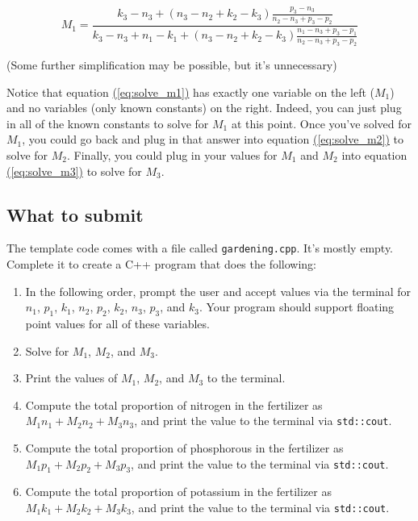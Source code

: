 \documentclass{article}
\newcommand{\refeq}[1]{\hyperref[eq:#1]{(\ref{eq:#1})}}
\begin{document}
\begin{equation}
    \label{eq:solve_m1}
    M_1 = \frac{k_3 - n_3 + (n_3 - n_2 + k_2 - k_3)\frac{p_3 - n_3}{n_2 - n_3 + p_3 - p_2}}{k_3 - n_3 + n_1 - k_1 + (n_3 - n_2 + k_2 - k_3)\frac{n_1 - n_3 + p_3 - p_1}{n_2 - n_3 + p_3 - p_2}}
\end{equation}

(Some further simplification may be possible, but it's unnecessary)

Notice that equation \refeq{solve_m1} has exactly one variable on the left ($M_1$) and no variables (only known constants) on the right. Indeed, you can just plug in all of the known constants to solve for $M_1$ at this point. Once you've solved for $M_1$, you could go back and plug in that answer into equation \refeq{solve_m2} to solve for $M_2$. Finally, you could plug in your values for $M_1$ and $M_2$ into equation \refeq{solve_m3} to solve for $M_3$.

\subsection{What to submit}

The template code comes with a file called \texttt{gardening.cpp}. It's mostly empty. Complete it to create a C++ program that does the following:

\begin{enumerate}
    \item In the following order, prompt the user and accept values via the terminal for $n_1$, $p_1$, $k_1$, $n_2$, $p_2$, $k_2$, $n_3$, $p_3$, and $k_3$. Your program should support floating point values for all of these variables. 
    \item Solve for $M_1$, $M_2$, and $M_3$.
    \item Print the values of $M_1$, $M_2$, and $M_3$ to the terminal.
    \item \label{step:nitrogen_proportion} Compute the total proportion of nitrogen in the fertilizer as $M_1n_1 + M_2n_2 + M_3n_3$, and print the value to the terminal via \texttt{std::cout}.
    \item \label{step:phosphorous_proportion} Compute the total proportion of phosphorous in the fertilizer as $M_1p_1 + M_2p_2 + M_3p_3$, and print the value to the terminal via \texttt{std::cout}.
    \item \label{step:potassium_proportion} Compute the total proportion of potassium in the fertilizer as $M_1k_1 + M_2k_2 + M_3k_3$, and print the value to the terminal via \texttt{std::cout}.
\end{enumerate}
\end{document}
